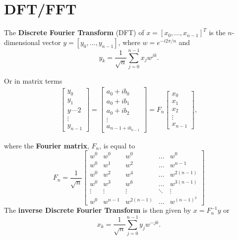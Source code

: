 \section{DFT/FFT}
\begin{definition}
The \textbf{Discrete Fourier Transform} (DFT) of $x = [x_0,...,x_{n-1}]^T$ is the $n$-dimensional vector $y = [y_0,...,y_{n-1}]$, where $w = e^{-i2\pi/n}$ and
$$
y_k = \frac{1}{\sqrt{n}} \sum_{j=0}^{n-1}x_j w^{jk}.
$$
\end{definition}

Or in matrix terms
\begin{gather*}
\begin{bmatrix}
    y_0 \\
    y_1 \\
    y—2 \\
    \vdots \\
    y_{n-1}
\end{bmatrix}
=
\begin{bmatrix}
    a_0 + ib_0 \\
    a_0 + ib_1 \\
    a_0 + ib_2 \\
    \vdots \\
    a_{n-1 + ib_{n-1}}
\end{bmatrix}
=
F_n
\begin{bmatrix}
    x_0 \\
    x_1 \\
    x_2 \\
    \vdots \\
    x_{n-1}
\end{bmatrix},
\end{gather*}

where the \textbf{Fourier matrix}, $F_n$, is equal to
$$
F_n = \frac{1}{\sqrt{n}}
\begin{bmatrix}
    w^0 & w^0 & w^0 & \hdots & w^0 \\
    w^0 & w^1 & w^2 & \hdots & w^{n-1} \\
    w^0 & w^2 & w^4 & \hdots & w^{2(n-1)} \\
    w^0 & w^3 & w^6 & \hdots & w^{3(n-1)} \\
    \vdots & \vdots & \vdots & \ddots & \vdots \\
    w^0 & w^{n-1} & w^{2(n-1)} & \hdots & w^{(n-1)^2}
\end{bmatrix}
$$
The \textbf{inverse Discrete Fourier Transform} is then given by $x = F_n^{-1}y$ or 
$$
x_k = \frac{1}{\sqrt{n}} \sum_{j=0}^{n-1}y_j w^{-jk}.
$$

